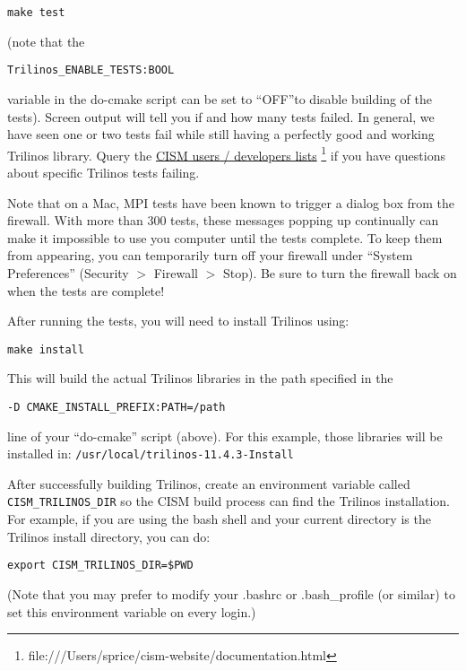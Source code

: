  \texttt{make test} 

(note that the

\begin{verbatim}
Trilinos_ENABLE_TESTS:BOOL
\end{verbatim}

variable in the do-cmake script can be set to ``OFF''to disable building of the tests). 
Screen output will tell you if and how many tests failed. In general, we have seen 
one or two tests fail while still having a perfectly good and working Trilinos library. 
Query the \href{file:///Users/sprice/cism-website/documentation.html}{CISM users / developers lists}
\footnote{file:///Users/sprice/cism-website/documentation.html} if you have questions 
about specific Trilinos tests failing. 

\begin{mdframed}[style=mac] %
Note that on a Mac, MPI tests have been known to trigger a dialog box from the firewall. 
With more than 300 tests, these messages popping up continually can make it impossible 
to use you computer until the tests complete. To keep them from appearing, you can temporarily 
turn off your firewall under ``System Preferences'' (Security $>$ Firewall $>$ Stop). 
Be sure to turn the firewall back on when the tests are complete!
\end{mdframed}              %

After running the tests, you will need to install Trilinos using:

 \texttt{make install}

This will build the actual Trilinos libraries in the path specified in the

\begin{verbatim}
-D CMAKE_INSTALL_PREFIX:PATH=/path
\end{verbatim} 

line of your ``do-cmake'' script (above). For this example, those libraries will be 
installed in: \texttt{/usr/local/trilinos-11.4.3-Install}

After successfully building Trilinos, create an environment variable called \texttt{CISM\_TRILINOS\_DIR}
so the CISM build process can find the Trilinos installation.  For example, if you 
are using the bash shell and your current directory is the Trilinos install directory, you can do:
\begin{verbatim}
export CISM_TRILINOS_DIR=$PWD
\end{verbatim}
(Note that you may prefer to modify your .bashrc or .bash\_profile (or similar)
to set this environment variable on every login.)

